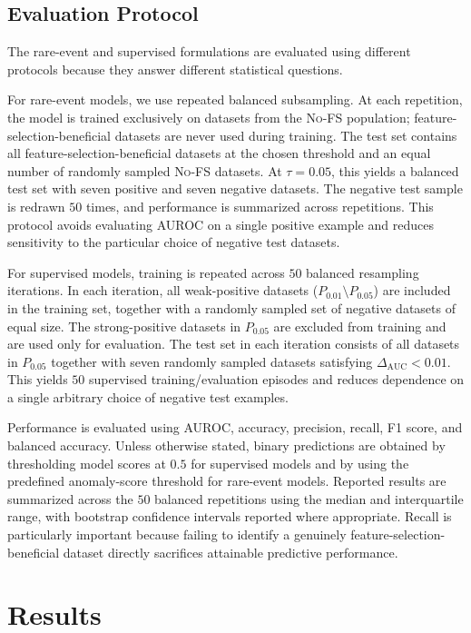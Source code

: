 \documentclass[preprint,12pt,authoryear]{elsarticle}
\begin{document}
\subsection{Evaluation Protocol}
\label{sec:evaluation_protocol}

The rare-event and supervised formulations are evaluated using different protocols because they answer different statistical questions.

For rare-event models, we use repeated balanced subsampling. At each repetition, the model is trained exclusively on datasets from the \textsc{No-FS} population; feature-selection-beneficial datasets are never used during training. The test set contains all feature-selection-beneficial datasets at the chosen threshold and an equal number of randomly sampled \textsc{No-FS} datasets. At $\tau=0.05$, this yields a balanced test set with seven positive and seven negative datasets. The negative test sample is redrawn $50$ times, and performance is summarized across repetitions. This protocol avoids evaluating AUROC on a single positive example and reduces sensitivity to the particular choice of negative test datasets.

For supervised models, training is repeated across $50$ balanced resampling iterations. In each iteration, all weak-positive datasets ($P_{0.01} \setminus P_{0.05}$) are included in the training set, together with a randomly sampled set of negative datasets of equal size. The strong-positive datasets in $P_{0.05}$ are excluded from training and are used only for evaluation. The test set in each iteration consists of all datasets in $P_{0.05}$ together with seven randomly sampled datasets satisfying $\Delta_{\mathrm{AUC}} < 0.01$. This yields $50$ supervised training/evaluation episodes and reduces dependence on a single arbitrary choice of negative test examples.

Performance is evaluated using AUROC, accuracy, precision, recall, F1 score, and balanced accuracy. Unless otherwise stated, binary predictions are obtained by thresholding model scores at $0.5$ for supervised models and by using the predefined anomaly-score threshold for rare-event models. Reported results are summarized across the $50$ balanced repetitions using the median and interquartile range, with bootstrap confidence intervals reported where appropriate. Recall is particularly important because failing to identify a genuinely feature-selection-beneficial dataset directly sacrifices attainable predictive performance.

\section{Results}
\label{sec:results}
\end{document}
